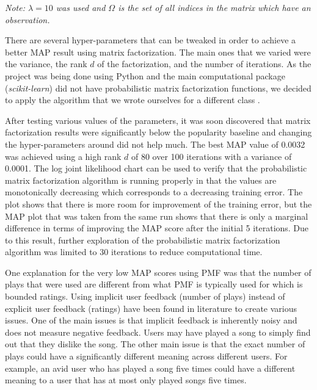 \documentclass[12pt,preprint]{aastex}
\begin{document}
\emph{Note: $\lambda = 10$ was used and $\Omega$ is the set of all indices in the matrix which have an observation.}

There are several hyper-parameters that can be tweaked in order to achieve a better MAP result using matrix factorization. The main ones that we varied were the variance, the rank $d$ of the factorization, and the number of iterations. As the project was being done using Python and the main computational package (\emph{scikit-learn}) did not have probabilistic matrix factorization functions, we decided to apply the algorithm that we wrote ourselves for a different class \citep{koren2009matrix}. 
 
After testing various values of the parameters, it was soon discovered that matrix factorization results were significantly below the popularity baseline and changing the hyper-parameters around did not help much. The best MAP value of 0.0032 was achieved using a high rank $d$ of 80 over 100 iterations with a variance of 0.0001. The log joint likelihood chart can be used to verify that the probabilistic matrix factorization algorithm is running properly in that the values are monotonically decreasing which corresponds to a decreasing training error. The plot shows that there is more room for improvement of the training error, but the MAP plot that was taken from the same run shows that there is only a marginal difference in terms of improving the MAP score after the initial 5 iterations. Due to this result, further exploration of the probabilistic matrix factorization algorithm was limited to 30 iterations to reduce computational time. 
 
One explanation for the very low MAP scores using PMF was that the number of plays that were used are different from what PMF is typically used for which is bounded ratings. Using implicit user feedback (number of plays) instead of explicit user feedback (ratings) have been found in literature to create various issues. One of the main issues is that implicit feedback is inherently noisy and does not measure negative feedback. Users may have played a song to simply find out that they dislike the song. The other main issue is that the exact number of plays could have a significantly different meaning across different users. For example, an avid user who has played a song five times could have a different meaning to a user that has at most only played songs five times.
 
\end{document}
